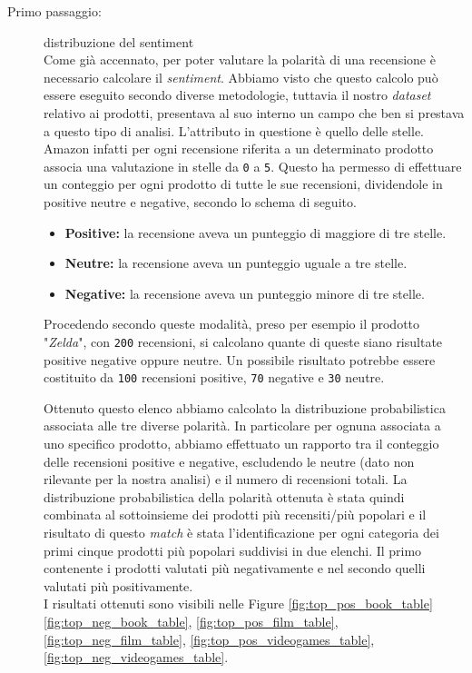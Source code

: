 		\begin{description}
		\item [Primo passaggio:] distribuzione del sentiment\\
			Come già accennato, per poter valutare la polarità di una recensione è necessario calcolare il \textit{sentiment}. Abbiamo visto che questo calcolo può essere eseguito secondo diverse metodologie, tuttavia il nostro \textit{dataset} relativo ai prodotti, presentava al suo interno un campo che ben si prestava a questo tipo di analisi. L'attributo in questione è quello delle stelle. Amazon infatti per ogni recensione riferita a un determinato prodotto associa una valutazione in stelle da \verb|0| a \verb|5|. Questo ha permesso di effettuare un conteggio per ogni prodotto di tutte le sue recensioni, dividendole in positive neutre e negative, secondo lo schema di seguito.
			
			\begin{itemize}
				\item \textbf{Positive:} la recensione aveva un punteggio di maggiore di tre stelle.
				\item \textbf{Neutre:} la recensione aveva un punteggio uguale a tre stelle.
				\item \textbf{Negative:} la recensione aveva un punteggio minore di tre stelle.
			\end{itemize}
			
			Procedendo secondo queste modalità, preso per esempio il prodotto "\textit{Zelda}", con \verb|200| recensioni, si calcolano quante di queste siano risultate positive negative oppure neutre. Un possibile risultato potrebbe essere costituito da \verb|100| recensioni positive, \verb|70| negative e \verb|30| neutre. 
					
			Ottenuto questo elenco abbiamo calcolato la distribuzione probabilistica associata alle tre diverse polarità. In particolare per ognuna associata a uno specifico prodotto, abbiamo effettuato un rapporto tra il conteggio delle recensioni positive e negative, escludendo le neutre (dato non rilevante per la nostra analisi) e il numero di recensioni totali. La distribuzione probabilistica della polarità ottenuta è stata quindi combinata al sottoinsieme dei prodotti più recensiti/più popolari e il risultato di questo \textit{match} è stata l'identificazione per ogni categoria dei primi cinque prodotti più popolari suddivisi in due elenchi. Il primo contenente i prodotti valutati più negativamente e nel secondo quelli valutati più positivamente. \\
			I risultati ottenuti sono visibili nelle Figure \ref{fig:top_pos_book_table} \ref{fig:top_neg_book_table}, \ref{fig:top_pos_film_table}, \ref{fig:top_neg_film_table}, \ref{fig:top_pos_videogames_table}, \ref{fig:top_neg_videogames_table}.
			

\end{description}
